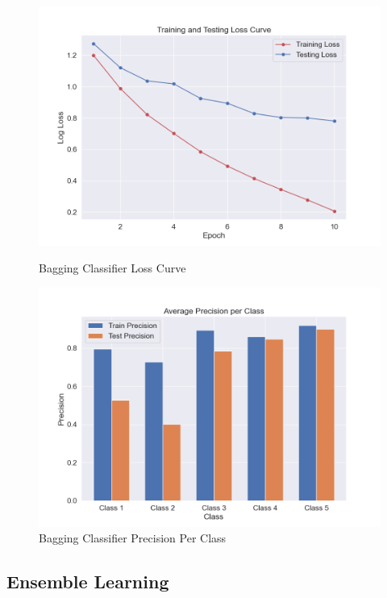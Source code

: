\begin{figure}[H]
	\begin{minipage}[b]{0.45\textwidth}
		\centering
		\includegraphics[width=\textwidth]{img/paper_1/loss_curve.png}
		\caption{Bagging Classifier Loss Curve}
	\end{minipage}
	\hfill
	\begin{minipage}[b]{0.45\textwidth}
		\centering
		\includegraphics[width=\textwidth]{img/paper_1/precision_per_class.png}
		\caption{Bagging Classifier Precision Per Class}
	\end{minipage}
\end{figure}


\subsection{Ensemble Learning}

